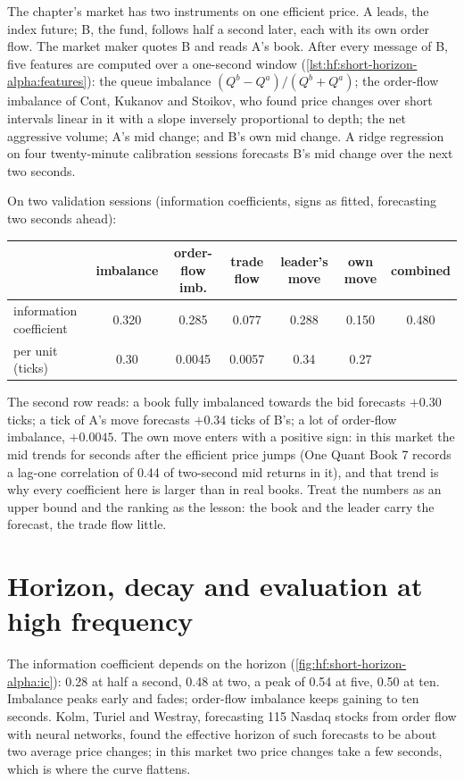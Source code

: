 The chapter's market has two instruments on one efficient price. A leads, the index future; B, the fund, follows half a second later, each with its
own order flow. The market maker quotes B and reads A's book. After every message of B, five features are computed over a one-second window
(\cref{lst:hf:short-horizon-alpha:features}): the queue imbalance $(Q^b-Q^a)/(Q^b+Q^a)$; the order-flow imbalance of Cont, Kukanov and Stoikov,
who found price changes over short intervals linear in it with a slope inversely proportional to depth; the net aggressive volume; A's mid change;
and B's own mid change. A ridge regression on four twenty-minute calibration sessions forecasts B's mid change over the next two seconds.

On two validation sessions (information coefficients, signs as fitted, forecasting two seconds ahead):

\begin{center}
\small
\begin{tabular}{@{}lcccccc@{}}
\toprule
& imbalance & order-flow imb. & trade flow & leader's move & own move & combined\\
\midrule
information coefficient & 0.320 & 0.285 & 0.077 & 0.288 & 0.150 & 0.480\\
per unit (ticks) & 0.30 & 0.0045 & 0.0057 & 0.34 & 0.27 & \\
\bottomrule
\end{tabular}
\end{center}

The second row reads: a book fully imbalanced towards the bid forecasts $+0.30$ ticks; a tick of A's move forecasts $+0.34$ ticks of B's; a lot of
order-flow imbalance, $+0.0045$. The own move enters with a positive sign: in this market the mid trends for seconds after the efficient price jumps
(One Quant Book 7 records a lag-one correlation of 0.44 of two-second mid returns in it), and that trend is why every coefficient here is larger than
in real books. Treat the numbers as an upper bound and the ranking as the lesson: the book and the leader carry the forecast, the trade flow little.

\section{Horizon, decay and evaluation at high frequency}

The information coefficient depends on the horizon (\cref{fig:hf:short-horizon-alpha:ic}): 0.28 at half a second, 0.48 at two, a peak of 0.54 at
five, 0.50 at ten. Imbalance peaks early and fades; order-flow imbalance keeps gaining to ten seconds. Kolm, Turiel and Westray, forecasting 115
Nasdaq stocks from order flow with neural networks, found the effective horizon of such forecasts to be about two average price changes; in this
market two price changes take a few seconds, which is where the curve flattens.

